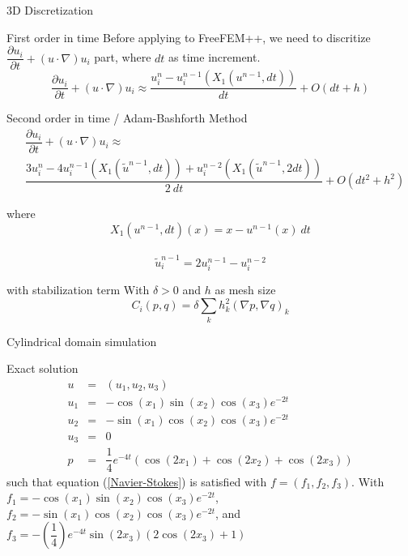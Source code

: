 \documentclass{beamer}
\begin{document}
\begin{frame}{3D Discretization}
\begin{block}{First order in time}
	Before applying to FreeFEM++, we need to discritize $ \dfrac{\partial u_{i}}{\partial t} + (u \cdot \nabla)u_{i} $ part, where $ dt $ as time increment.
	\[ \dfrac{\partial u_{i}}{\partial t} + (u \cdot \nabla)u_{i} \approx \dfrac{u_{i}^{n}-u_{i}^{n-1}(X_{1}(u^{n-1},dt))}{dt} + O(dt+h) \]
\end{block}
\begin{block}{Second order in time / Adam-Bashforth Method}
	\begin{eqnarray}\nonumber
		&\dfrac{\partial u_{i}}{\partial t} + (u \cdot \nabla)u_{i} \approx\\ \nonumber &\dfrac{3u_{i}^{n}-4u_{i}^{n-1}(X_{1}(\tilde{u}^{n-1},dt))+u_{i}^{n-2}(X_{1}(\tilde{u}^{n-1},2dt))}{2\ dt} + O(dt^2+h^2)
	\end{eqnarray}
\end{block}
\end{frame}

\begin{frame}
\begin{block}{where}
	\[ X_{1}(u^{n-1},dt)(x) = x - u^{n-1}(x)\ dt\]\\
	\[\tilde{u}^{n-1}_{i} = 2u_{i}^{n-1}-u_{i}^{n-2}\]
\end{block}
\begin{block}{with stabilization term}
	With $ \delta>0 $ and $ h $ as mesh size
	\[ C_{i}(p,q) = \delta \sum_{k} h_{k}^{2}(\nabla p, \nabla q)_{k} \]
\end{block}
\end{frame}

\begin{frame}{Cylindrical domain simulation}
\begin{block}{Exact solution}
		\begin{eqnarray}\nonumber
		u &=& (u_{1},u_{2},u_{3}) \\ \nonumber
		u_{1} &=& -\cos(x_{1}) \sin(x_{2}) \cos(x_3) e^{-2t}\\ \nonumber
		u_{2} &=& -\sin(x_{1}) \cos(x_{2}) \cos(x_3) e^{-2t}\\ \nonumber
		u_{3} &=& 0 \\ \nonumber
		p&=& \dfrac{1}{4} e^{-4t} (\cos(2x_1)+\cos(2x_2)+\cos(2x_3))
		\end{eqnarray}
		such that equation (\ref{Navier-Stokes}) is satisfied with $ f = (f_{1},f_{2},f_3) $. With $ f_{1} = -\cos(x_1) \sin(x_2) \cos(x_3) e^{-2t} $, $ f_{2} = -\sin(x_1) \cos(x_2) \cos(x_3) e^{-2t}  $, and $ f_{3} = -(\dfrac{1}{4})e^{-4t}\sin(2x_3)(2\cos(2x_3)+1)   $
\end{block}
\end{frame}
\end{document}
